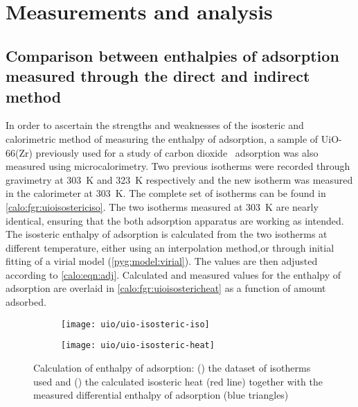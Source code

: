 
\section{Measurements and analysis}

\subsection{Comparison between enthalpies of adsorption measured
	through the direct and indirect method}

In order to ascertain the strengths and weaknesses of the isosteric 
and calorimetric method of measuring the enthalpy of adsorption, 
a sample of UiO-66(Zr) previously used for a study of 
carbon dioxide~\cite{wiersumEvaluationUiO66GasBased2011} adsorption
was also measured using microcalorimetry.
Two previous isotherms were recorded through gravimetry at \SI{303}{\kelvin} and
\SI{323}{\kelvin} respectively and the new isotherm was measured in the 
calorimeter at \SI{303}{\kelvin}. The complete set of isotherms can
be found in \autoref{calo:fgr:uioisostericiso}.
The two isotherms measured at \SI{303}{\kelvin} are nearly identical, 
ensuring that the both adsorption apparatus are working as intended.
The isosteric enthalpy of adsorption is calculated from the two isotherms
at different temperature, either using an interpolation method,or through
initial fitting of a virial model (\autoref{pyg:model:virial}).
The values are then adjusted according to \autoref{calo:eqn:adj}.
Calculated and measured values for the enthalpy of adsorption are overlaid
in \autoref{calo:fgr:uioisostericheat} as a function of amount adsorbed.

\begin{figure}[htb]
	\centering

	\begin{subfigure}[b]{.5\textwidth}
		\centering
		\texttt{[image: uio/uio-isosteric-iso]}
		\caption{}%
		\label{calo:fgr:uioisostericiso}
	\end{subfigure}%
	\begin{subfigure}[b]{.5\textwidth}
		\centering
		\texttt{[image: uio/uio-isosteric-heat]}
		\caption{}%
		\label{calo:fgr:uioisostericheat}
	\end{subfigure}
	\caption{Calculation of enthalpy of adsorption:
		(\protect{})
		the dataset of isotherms used and
		(\protect{}) the calculated
		isosteric heat (red line) together with the measured
		differential enthalpy of adsorption (blue triangles)}%
	\label{calo:fgr:uioisosteric}

\end{figure}

